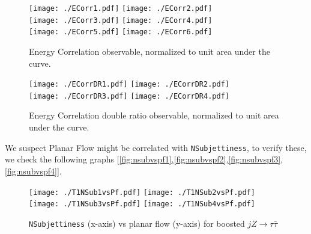 \begin{figure}[H]
    \begin{center}
        \texttt{[image: ./ECorr1.pdf]}
        \texttt{[image: ./ECorr2.pdf]}\\
        \texttt{[image: ./ECorr3.pdf]}
        \texttt{[image: ./ECorr4.pdf]}\\
        \texttt{[image: ./ECorr5.pdf]}
        \texttt{[image: ./ECorr6.pdf]}\\
        \caption{ Energy Correlation observable, normalized to unit area under the curve. }
        \label{fig:ECorr}
    \end{center}
\end{figure}

\begin{figure}[H]
    \begin{center}
        \texttt{[image: ./ECorrDR1.pdf]}
        \texttt{[image: ./ECorrDR2.pdf]}\\
        \texttt{[image: ./ECorrDR3.pdf]}
        \texttt{[image: ./ECorrDR4.pdf]}\\
        \caption{ Energy Correlation double ratio observable, normalized to unit area under the curve. }
        \label{fig:ECorrDR}
    \end{center}
\end{figure}

We suspect Planar Flow might be correlated with {\tt NSubjettiness}, to verify these, we check the following graphs [\autoref{fig:nsubvspf1},\autoref{fig:nsubvspf2},\autoref{fig:nsubvspf3},\autoref{fig:nsubvspf4}].

\begin{figure}[H]
    \begin{center}
        \texttt{[image: ./T1NSub1vsPf.pdf]}
        \texttt{[image: ./T1NSub2vsPf.pdf]}\\
        \texttt{[image: ./T1NSub3vsPf.pdf]}
        \texttt{[image: ./T1NSub4vsPf.pdf]}\\
        \caption{ {\tt NSubjettiness} (x-axis) vs planar flow (y-axis) for boosted $jZ\rightarrow \tau \bar{\tau}$ }
        \label{fig:nsubvspf1}
    \end{center}
\end{figure}

